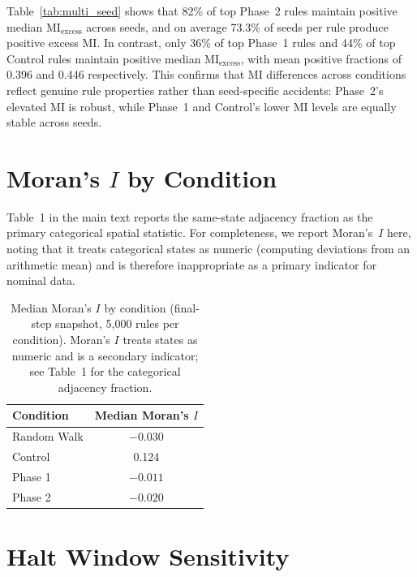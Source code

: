 \documentclass[letterpaper]{article}
\begin{document}
Table~\ref{tab:multi_seed} shows that 82\% of top Phase~2 rules maintain
positive median $\mathrm{MI}_{\mathrm{excess}}$ across seeds, and on average
73.3\% of seeds per rule produce positive excess MI.  In contrast, only 36\%
of top Phase~1 rules and 44\% of top Control rules maintain positive median
$\mathrm{MI}_{\mathrm{excess}}$, with mean positive fractions of 0.396 and
0.446 respectively.  This confirms that MI differences across conditions
reflect genuine rule properties rather than seed-specific accidents: Phase~2's
elevated MI is robust, while Phase~1 and Control's lower MI levels are equally
stable across seeds.

\section{Moran's $I$ by Condition}
\label{app:morans_i}

Table~1 in the main text reports the same-state adjacency fraction as the
primary categorical spatial statistic.  For completeness, we report
Moran's~$I$ here, noting that it treats categorical states as numeric
(computing deviations from an arithmetic mean) and is therefore
inappropriate as a primary indicator for nominal data.

\begin{table}[htbp]
\centering
\caption{Median Moran's $I$ by condition (final-step snapshot,
5{,}000 rules per condition).  Moran's $I$ treats states as numeric
and is a secondary indicator; see Table~1 for the categorical
adjacency fraction.}
\label{tab:morans_i}
\begin{tabular}{lc}
\toprule
Condition & Median Moran's $I$ \\
\midrule
Random Walk & $-0.030$ \\
Control     & 0.124 \\
Phase 1     & $-0.011$ \\
Phase 2     & $-0.020$ \\
\bottomrule
\end{tabular}
\end{table}

\section{Halt Window Sensitivity}
\label{app:halt_window}
\end{document}

